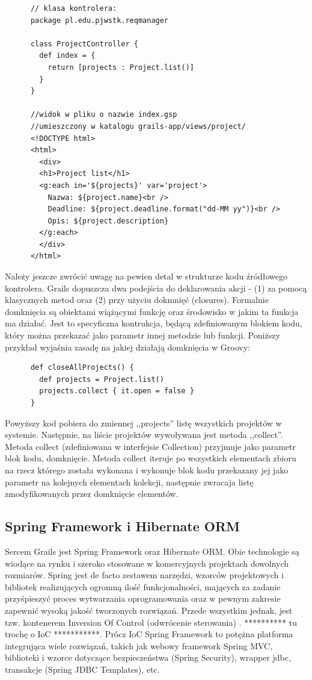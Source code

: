     \begin{verbatim} 
      // klasa kontrolera:
      package pl.edu.pjwstk.reqmanager

      class ProjectController {
        def index = { 
          return [projects : Project.list()]
        }   
      }

      //widok w pliku o nazwie index.gsp 
      //umieszczony w katalogu grails-app/views/project/
      <!DOCTYPE html>
      <html>
        <div>
        <h1>Project list</h1>
        <g:each in='${projects}' var='project'>
          Nazwa: ${project.name}<br />
          Deadline: ${project.deadline.format("dd-MM yy")}<br />
          Opis: ${project.description} 
        </g:each>
        </div>
      </html>

    \end{verbatim}

    Należy jeszcze zwrócić uwagę na pewien detal w strukturze kodu źródłowego kontrolera. Grails dopuszcza dwa podejścia do deklarowania akcji - (1) za pomocą klasycznych metod oraz (2) przy użyciu dokmnięć (closures). Formalnie domknięcia są obiektami wiążącymi funkcję oraz środowisko w jakim ta funkcja ma działać. Jest to specyficzna kontrukcja, będącą zdefiniowanym blokiem kodu, który można przekazać jako parametr innej metodzie lub funkcji. Poniższy przykład wyjaśnia zasadę na jakiej działają domknięcia w Groovy: 
    
    \begin{verbatim}
      def closeAllProjects() {
        def projects = Project.list()
        projects.collect { it.open = false }
      }
    \end{verbatim} 
    
    Powyższy kod pobiera do zmiennej ,,projects'' listę wszystkich projektów w systemie. Następnie, na liście projektów wywoływana jest metoda ,,collect''. Metoda collect (zdefiniowana w interfejsie Collection) przyjmuje jako parametr blok kodu, domknięcie. Metoda collect iteruje po wszystkich elementach zbioru na rzecz którego została wykonana i wykonuje blok kodu przekazany jej jako parametr na kolejnych elementach kolekcji, następnie zwracaja listę zmodyfikowanych przez domknięcie elementów.

    \subsection{Spring Framework i Hibernate ORM}

      Sercem Grails jest Spring Framework oraz Hibernate ORM. Obie technologie są wiodące na rynku i szeroko stosowane w komercyjnych projektach dowolnych rozmiarów. Spring jest de facto zestawem narzędzi, wzorców projektowych i bibliotek realizujących ogromną ilość funkcjonalności, mających za zadanie przyśpieszyć proces wytwarzania oprogramowania oraz w pewnym zakresie zapewnić wysoką jakość tworzonych rozwiązań. Przede wszystkim jednak, jest tzw. kontenerem Inversion Of Control (odwrócenie sterowania) \cite{MFow01}. ********** tu trochę o IoC ***********. Prócz IoC Spring Framework to potężna platforma integrująca wiele rozwiązań, takich jak webowy framework Spring MVC, biblioteki i wzorce dotyczące bezpieczeństwa (Spring Security), wrapper jdbc, transakcje (Spring JDBC Templates), etc.

